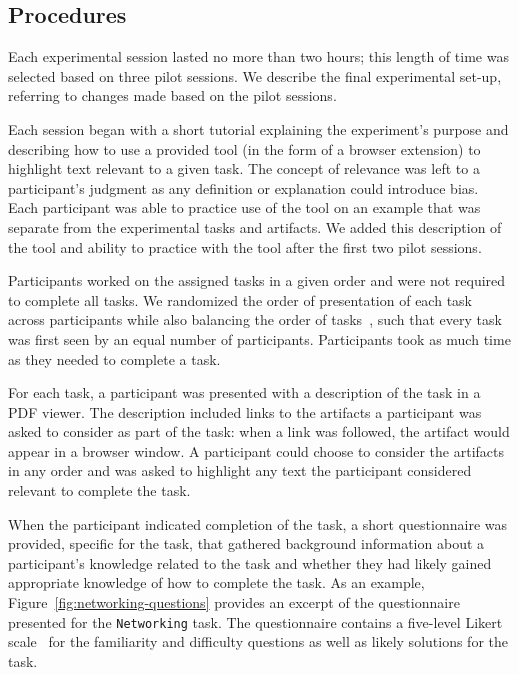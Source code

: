 \subsection{Procedures}
\label{cp3:procedures}



Each experimental session lasted no more than two hours; this length
of time was selected based on three pilot sessions.
We describe the final experimental set-up, referring to
changes made based on the pilot sessions.



Each session began with a short tutorial explaining the
experiment's purpose and describing how to use a provided tool (in
the form of a browser extension) to
highlight text relevant to a given task.
The concept of relevance was left to a participant's judgment as any
definition or explanation could introduce bias.
Each participant was able to practice use of the
tool on an example that was separate from the experimental tasks and
artifacts. We added this description of the tool and ability to 
practice with the tool after the first two pilot sessions. 


Participants worked on the assigned tasks in a given order and were
not required to complete all tasks.
We randomized the order of presentation of each task across
participants while also balancing the order of tasks~\cite{wohlin2012},
such that every task was first seen by an equal number of participants. 
Participants took as much time as they needed to complete a task.


For each task, a participant was presented with a description of the task in a PDF
viewer. The description included links to the artifacts a participant
was asked to consider as part of the task: when a link was followed,
the artifact would appear in a browser window.
A participant could choose to
consider the artifacts in any order and was asked to highlight any
text the participant considered relevant to complete the task.




When the participant
indicated completion of the task, a short questionnaire was
provided, specific for the task, that gathered background
information about a participant's knowledge related to the task
and whether they had likely gained appropriate knowledge
of how to complete the task. 
As an example, Figure~\ref{fig:networking-questions} provides an 
excerpt of the questionnaire presented for the \texttt{Networking} task.
The questionnaire contains a five-level Likert scale~\cite{likert1932technique}
for the familiarity and difficulty questions as well as likely solutions for the task. 


